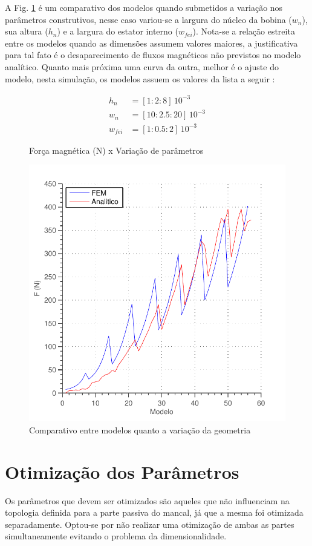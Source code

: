 A Fig. \ref{fig:validacao_ativo_2d} é um comparativo dos modelos quando submetidos a variação nos parâmetros construtivos, nesse caso variou-se a largura do núcleo da bobina ($w_n$), sua altura ($h_n$) e a largura do estator interno ($w_{fei}$). Nota-se a relação estreita entre os modelos quando as dimensões assumem valores maiores, a justificativa para tal fato é o desaparecimento de fluxos magnéticos não previstos no modelo analítico. Quanto mais próxima uma curva da outra, melhor é o ajuste do modelo, nesta simulação, os modelos assuem os valores da lista a seguir :

\begin{align}
	h_n		&=	[1:2:8] \, 10^{-3} \\
	w_n		&=	[10:2.5:20] \, 10^{-3} \\
	w_{fei}	&= 	[1:0.5:2] \, 10^{-3}
\end{align}

\begin{figure}[th]
	\centering
	\caption{Força magnética (N) x Variação de parâmetros}
	\includegraphics[width=0.7\linewidth]{Figs/Simulacoes/Ativo/validacao_ativo_2d}
	\caption{Comparativo entre modelos quanto a variação da geometria}
	\label{fig:validacao_ativo_2d}
\end{figure}



\section{Otimização dos Parâmetros}

Os parâmetros que devem ser otimizados são aqueles que não influenciam na topologia definida para a parte passiva do mancal, já que a mesma foi otimizada separadamente. Optou-se por não realizar uma otimização de ambas as partes simultaneamente evitando o problema da dimensionalidade.

